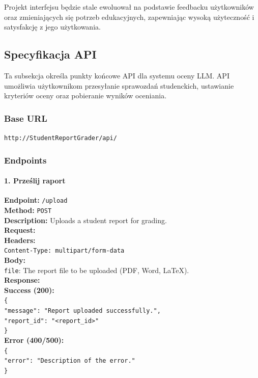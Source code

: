 \documentclass[a4paper, 12pt]{article}
\begin{document}
Projekt interfejsu będzie stale ewoluował na podstawie feedbacku użytkowników oraz zmieniających się potrzeb edukacyjnych, zapewniając wysoką użyteczność i satysfakcję z jego użytkowania.

\subsection{Specyfikacja API}

Ta subsekcja określa punkty końcowe API dla systemu oceny LLM. API umożliwia użytkownikom przesyłanie sprawozdań studenckich, ustawianie kryteriów oceny oraz pobieranie wyników oceniania.

\subsubsection*{Base URL}

\texttt{http://StudentReportGrader/api/}

\subsubsection*{Endpoints}

\paragraph{1. Prześlij raport}

\begin{tabbing}
\textbf{Endpoint:} \= \texttt{/upload} \\
\textbf{Method:} \> \texttt{POST} \\
\textbf{Description:} \> Uploads a student report for grading. \\
\textbf{Request:} \\
\> \textbf{Headers:} \\
\> \> \texttt{Content-Type: multipart/form-data} \\
\> \textbf{Body:} \\
\> \> \texttt{file}: The report file to be uploaded (PDF, Word, LaTeX). \\
\textbf{Response:} \\
\> \textbf{Success (200):} \\
\> \> \texttt{\{ \\
\> \> \> "message": "Report uploaded successfully.", \\
\> \> \> "report\_id": "<report\_id>" \\
\> \> \}} \\
\> \textbf{Error (400/500):} \\
\> \> \texttt{\{ \\
\> \> \> "error": "Description of the error." \\
\> \> \}}
\end{tabbing}
\end{document}
